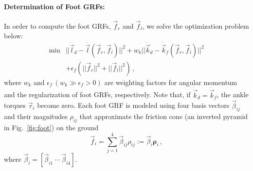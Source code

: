 \documentclass{llncs}
\newcommand{\vrho} {\boldsymbol{\rho}}
\newcommand{\vbeta}{\vec{\beta}}
\newcommand{\vtau}{\vec{\tau}}
\newcommand{\vf}{\vec{f}}
\newcommand{\vdk} {\dot{\vec{k}}}
\newcommand{\vdl} {\dot{\vec{l}}}
\begin{document}
\paragraph{Determination of Foot GRFs:}
In order to compute the foot GRFs,  $\vf_r$ and $\vf_l$, we solve the optimization problem below:
\begin{align}
	\min &|| \vdl_d - \vdl(\vf_r,\vf_l) ||^2 + w_k || \vdk_d - \vdk_f(\vf_r,\vf_l) ||^2 \nonumber \\ &+\epsilon_f ( || \vf_r ||^2 + || \vf_l ||^2 ) \, ,
\label{eq:opt_f}
\end{align}
where $w_k$ and $\epsilon_f~(w_k \gg \epsilon_f > 0)$
are weighting factors for angular momentum and
the regularization of foot GRFs, respectively.
Note that, if $\vdk_d = \vdk_f$, the ankle torques $\vtau_i$ become zero.
Each foot GRF is modeled using four basis vectors $\vbeta_{ij}$
and their magnitudes $\rho_{ij}$ that approximate the friction cone (an inverted
pyramid in Fig.~\ref{fig:foot}) on the ground
\begin{equation}
	\vf_i = \sum_{j=1}^4  \vbeta_{ij} \rho_{ij} := \vbeta_i \vrho_i  \, , \label{eq:pyramid}
\end{equation}
where $\vbeta_i=[\vbeta_{i1}~\cdots~\vbeta_{i4} ]$.
\end{document}
